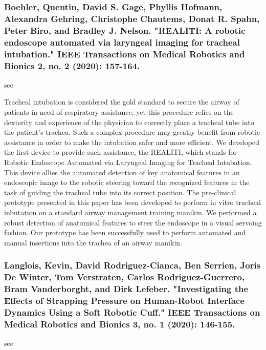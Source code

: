 \documentclass[conference]{IEEEtran}
\begin{document}
\medskip
\subsubsection{Boehler, Quentin, David S. Gage, Phyllis Hofmann, Alexandra Gehring, Christophe Chautems, Donat R. Spahn, Peter Biro, and Bradley J. Nelson. "REALITI: A robotic endoscope automated via laryngeal imaging for tracheal intubation." IEEE Transactions on Medical Robotics and Bionics 2, no. 2 (2020): 157-164.}
see \cite{boehler2020realiti}

Tracheal intubation is considered the gold standard to secure the airway of patients in need of respiratory assistance, yet this procedure relies on the dexterity and experience of the physician to correctly place a tracheal tube into the patient's trachea. Such a complex procedure may greatly benefit from robotic assistance in order to make the intubation safer and more efficient. We developed the first device to provide such assistance, the REALITI, which stands for Robotic Endoscope Automated via Laryngeal Imaging for Tracheal Intubation. This device allies the automated detection of key anatomical features in an endoscopic image to the robotic steering toward the recognized features in the task of guiding the tracheal tube into its correct position. The pre-clinical prototype presented in this paper has been developed to perform in vitro tracheal inbutation on a standard airway management training manikin. We performed a robust detection of anatomical features to steer the endoscope in a visual servoing fashion. Our prototype has been successfully used to perform automated and manual insertions into the trachea of an airway manikin.

\medskip
\subsubsection{Langlois, Kevin, David Rodriguez-Cianca, Ben Serrien, Joris De Winter, Tom Verstraten, Carlos Rodriguez-Guerrero, Bram Vanderborght, and Dirk Lefeber. "Investigating the Effects of Strapping Pressure on Human-Robot Interface Dynamics Using a Soft Robotic Cuff." IEEE Transactions on Medical Robotics and Bionics 3, no. 1 (2020): 146-155.}
see \cite{langlois2020investigating}
\end{document}
